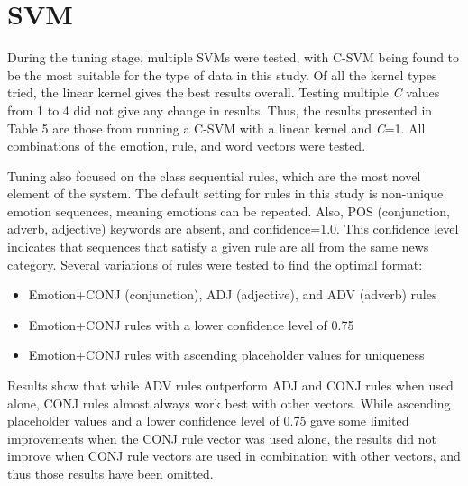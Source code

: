 \documentclass [11pt, proquest] {uwthesis}[2020/02/24]
\begin{document}
\section{SVM}
During the tuning stage, multiple SVMs were tested, with C-SVM being found to be the most suitable for the type of data in this study. Of all the kernel types tried, the linear kernel gives the best results overall. Testing multiple \textit{C} values from 1 to 4 did not give any change in results. Thus, the results presented in Table 5 are those from running a C-SVM with a linear kernel and \textit{C}=1. All combinations of the emotion, rule, and word vectors were tested.


Tuning also focused on the class sequential rules, which are the most novel element of the system. The default setting for rules in this study is non-unique emotion sequences, meaning emotions can be repeated. Also, POS (conjunction, adverb, adjective) keywords are absent, and confidence=1.0. This confidence level indicates that sequences that satisfy a given rule are all from the same news category. Several variations of rules were tested to find the optimal format:
\begin{itemize}
\item Emotion+CONJ (conjunction), ADJ (adjective), and ADV (adverb) rules
\item Emotion+CONJ rules with a lower confidence level of 0.75
\item Emotion+CONJ rules with ascending placeholder values for uniqueness
\end{itemize}
 
Results show that while ADV rules outperform ADJ and CONJ rules when used alone, CONJ rules almost always work best with other vectors. While ascending placeholder values and a lower confidence level of 0.75 gave some limited improvements when the CONJ rule vector was used alone, the results did not improve when CONJ rule vectors are used in combination with other vectors, and thus those results have been omitted.
\end{document}
